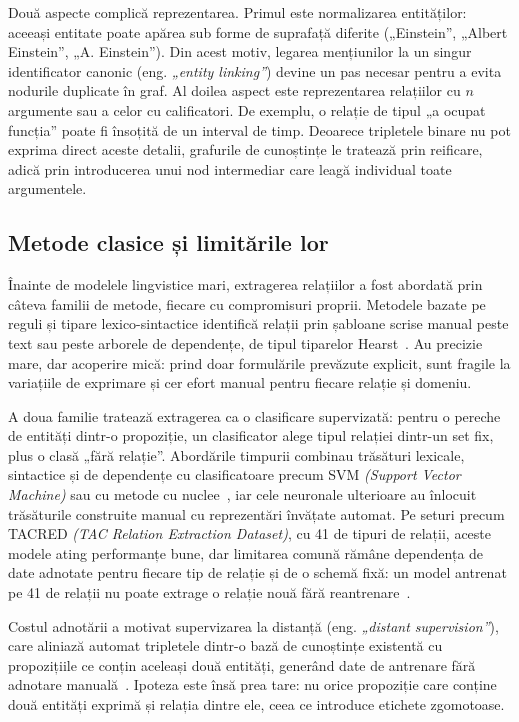 Două aspecte complică reprezentarea. Primul este normalizarea entităților: aceeași entitate poate apărea sub forme de suprafață diferite („Einstein”, „Albert Einstein”, „A. Einstein”). Din acest motiv, legarea mențiunilor la un singur identificator canonic (eng. \textit{„entity linking”}) devine un pas necesar pentru a evita nodurile duplicate în graf. Al doilea aspect este reprezentarea relațiilor cu $n$ argumente sau a celor cu calificatori. De exemplu, o relație de tipul „a ocupat funcția” poate fi însoțită de un interval de timp. Deoarece tripletele binare nu pot exprima direct aceste detalii, grafurile de cunoștințe le tratează prin reificare, adică prin introducerea unui nod intermediar care leagă individual toate argumentele.

\subsection{Metode clasice și limitările lor}

Înainte de modelele lingvistice mari, extragerea relațiilor a fost abordată prin câteva familii de metode, fiecare cu compromisuri proprii. Metodele bazate pe reguli și tipare lexico-sintactice identifică relații prin șabloane scrise manual peste text sau peste arborele de dependențe, de tipul tiparelor Hearst~\cite{hearst1992}. Au precizie mare, dar acoperire mică: prind doar formulările prevăzute explicit, sunt fragile la variațiile de exprimare și cer efort manual pentru fiecare relație și domeniu.

A doua familie tratează extragerea ca o clasificare supervizată: pentru o pereche de entități dintr-o propoziție, un clasificator alege tipul relației dintr-un set fix, plus o clasă „fără relație”. Abordările timpurii combinau trăsături lexicale, sintactice și de dependențe cu clasificatoare precum SVM \textit{(Support Vector Machine)} sau cu metode cu nuclee~\cite{hendrickx2010semeval}, iar cele neuronale ulterioare au înlocuit trăsăturile construite manual cu reprezentări învățate automat. Pe seturi precum TACRED \textit{(TAC Relation Extraction Dataset)}, cu 41 de tipuri de relații, aceste modele ating performanțe bune, dar limitarea comună rămâne dependența de date adnotate pentru fiecare tip de relație și de o schemă fixă: un model antrenat pe 41 de relații nu poate extrage o relație nouă fără reantrenare~\cite{zhang2017tacred}.

Costul adnotării a motivat supervizarea la distanță (eng. \textit{„distant supervision”}), care aliniază automat tripletele dintr-o bază de cunoștințe existentă cu propozițiile ce conțin aceleași două entități, generând date de antrenare fără adnotare manuală~\cite{mintz2009distant}. Ipoteza este însă prea tare: nu orice propoziție care conține două entități exprimă și relația dintre ele, ceea ce introduce etichete zgomotoase.

